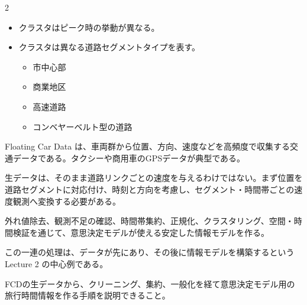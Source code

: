 \begin{multicols}{2}

\footnotesize

\raggedcolumns


\begin{itemize}
\item クラスタはピーク時の挙動が異なる。
\item クラスタは異なる道路セグメントタイプを表す。
\begin{itemize}
\item 市中心部
\item 商業地区
\item 高速道路
\item コンベヤーベルト型の道路
\end{itemize}
\end{itemize}

Floating Car Data は、車両群から位置、方向、速度などを高頻度で収集する交通データである。タクシーや商用車のGPSデータが典型である。\par

生データは、そのまま道路リンクごとの速度を与えるわけではない。まず位置を道路セグメントに対応付け、時刻と方向を考慮し、セグメント・時間帯ごとの速度観測へ変換する必要がある。\par

外れ値除去、観測不足の確認、時間帯集約、正規化、クラスタリング、空間・時間検証を通じて、意思決定モデルが使える安定した情報モデルを作る。\par

この一連の処理は、データが先にあり、その後に情報モデルを構築するという Lecture 2 の中心例である。\par

FCDの生データから、クリーニング、集約、一般化を経て意思決定モデル用の旅行時間情報を作る手順を説明できること。\par



\end{multicols}
